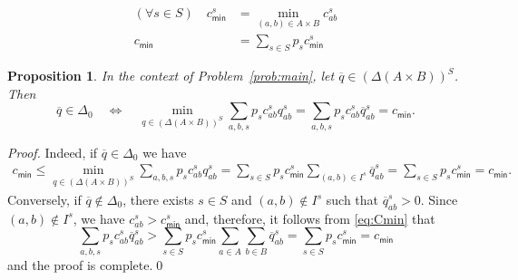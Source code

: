 \documentclass[10pt,a4paper]{amsart}
\newtheorem{proposition}{Proposition}
\begin{document}
\begin{align}
(\forall s\in S)\quad c_{\textsf{min}}^s &= \min_{(a,b) \in A\times B} 
c_{ab}^s\label{eq:Cmin}\\
c_{\textsf{min}} &= \sum_{s\in S}p_s 
c_{\textsf{min}}^s\label{eq:Cmin2}
\end{align}

\begin{proposition}
\label{p:achiev}
In the context of Problem~\ref{prob:main}, let 
$\overline{q}\in(\Delta(A\times B))^S$. Then 
\begin{equation}
\overline{q}\in\Delta_0\quad \Leftrightarrow\quad 
\min_{q\in(\Delta(A\times B))^S} 
\sum_{a,b,s}p_sc_{ab}^sq_{ab}^s=\sum_{a,b,s}p_sc_{ab}^s
\overline{q}_{ab}^s=c_{\textsf{min}}.
\end{equation}
\end{proposition}

\begin{proof}
Indeed, if $\overline{q}\in\Delta_0$
we have 
\begin{align}
{c_{\textsf{min}}\le }\min_{q\in(\Delta(A\times B))^S} 
\sum_{a,b,s}p_sc_{ab}^sq_{ab}^s 
= \sum_{s\in S}p_s c_{\textsf{min}}^s\!\!\!\!\sum_{(a,b)\in I^s}  
\overline{q}_{ab}^s = \sum_{s\in S}p_s c_{\textsf{min}}^s = 
c_{\textsf{min}}.\label{e:PrimalNoIC}
\end{align}
Conversely, if $\overline{q}\notin\Delta_0$, there exists 
$s\in S$ and $(a,b)\notin I^s$ such that $\overline{q}_{ab}^s>0$.
Since $(a,b)\notin I^s$, we have $c_{ab}^s>c_{\mathsf{min}}^s$ and, 
therefore,
it follows from \eqref{eq:Cmin} that
\begin{equation}
\sum_{a,b,s}p_sc_{ab}^s\overline{q}_{ab}^s>\sum_{s\in S}p_s 
c_{\textsf{min}}^s\sum_{a\in A}\sum_{b\in B}  
\overline{q}_{ab}^s = \sum_{s\in S}p_s c_{\textsf{min}}^s = 
c_{\textsf{min}}
\end{equation}
and the proof is complete.\qed
\end{proof}
\end{document}
